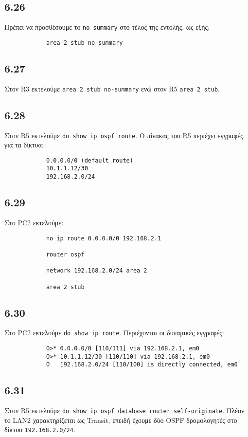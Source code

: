 \documentclass[a4paper, 12pt]{article}
\begin{document}
	\subsection*{6.26}
		Πρέπει να προσθέσουμε το \verb|no-summary| στο τέλος της εντολής, ως εξής:
		
		\begin{verbatim}
			area 2 stub no-summary
		\end{verbatim}

	\subsection*{6.27}
		Στον R3 εκτελούμε \verb|area 2 stub no-summary| ενώ στον R5 \verb|area 2 stub|.

	\subsection*{6.28}
		Στον R5 εκτελούμε \verb|do show ip ospf route|. Ο πίνακας του R5 περιέχει εγγραφές για τα δίκτυα:
		
		\begin{verbatim}
			0.0.0.0/0 (default route)
			10.1.1.12/30
			192.168.2.0/24
		\end{verbatim}

	\subsection*{6.29}
		Στο PC2 εκτελούμε:
		
		\begin{verbatim}
			no ip route 0.0.0.0/0 192.168.2.1
			
			router ospf
			
			network 192.168.2.0/24 area 2
			
			area 2 stub
		\end{verbatim}

	\subsection*{6.30}
		Στο PC2 εκτελούμε \verb|do show ip route|. Περιέχονται οι δυναμικές εγγραφές:
		
		\begin{verbatim}
			O>* 0.0.0.0/0 [110/111] via 192.168.2.1, em0
			O>* 10.1.1.12/30 [110/110] via 192.168.2.1, em0
			O   192.168.2.0/24 [110/100] is directly connected, em0
		\end{verbatim}

	\subsection*{6.31}
		Στον R5 εκτελούμε \verb|do show ip ospf database router self-originate|. Πλέον το LAN2 χαρακτηρίζεται ως Transit, επειδή έχουμε δύο OSPF δρομολογητές στο δίκτυο \verb|192.168.2.0/24|.
\end{document}
